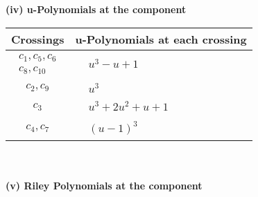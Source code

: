 \documentclass[1p]{elsarticle_modified}
\theoremstyle{definition}
\begin{document}
\newpage\renewcommand{\arraystretch}{1}
\flushleft \textbf{(iv) u-Polynomials at the component}\newline \\
\begin{tabular}{m{50pt}|m{274pt}}
Crossings & \hspace{64pt}u-Polynomials at each crossing \\
\hline $$\begin{aligned}c_{1},c_{5},c_{6}\\c_{8},c_{10}\end{aligned}$$&$\begin{aligned}
&u^3- u+1
\end{aligned}$\\
\hline $$\begin{aligned}c_{2},c_{9}\end{aligned}$$&$\begin{aligned}
&u^3
\end{aligned}$\\
\hline $$\begin{aligned}c_{3}\end{aligned}$$&$\begin{aligned}
&u^3+2 u^2+u+1
\end{aligned}$\\
\hline $$\begin{aligned}c_{4},c_{7}\end{aligned}$$&$\begin{aligned}
&(u-1)^3
\end{aligned}$\\
\hline
\end{tabular}\\~\\
\newpage\renewcommand{\arraystretch}{1}
\flushleft \textbf{(v) Riley Polynomials at the component}\newline \\
\end{document}
